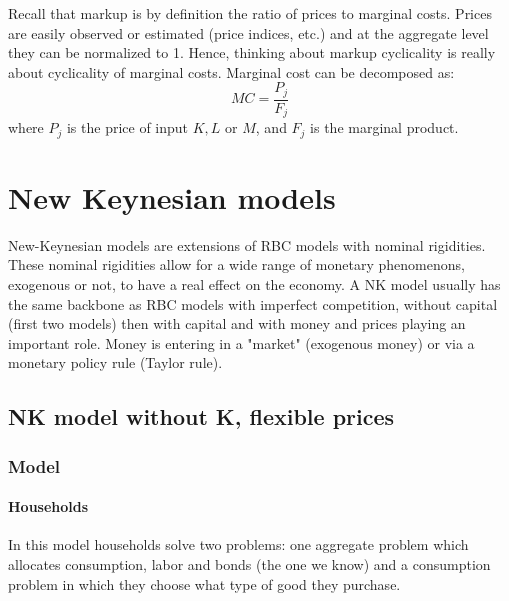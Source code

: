 \documentclass[12pt]{report}
\begin{document}
Recall that markup is by definition the ratio of prices to marginal costs. Prices are easily observed or estimated (price indices, etc.) and at the aggregate level they can be normalized to 1. Hence, thinking about markup cyclicality is really about cyclicality of marginal costs. Marginal cost can be decomposed as: $$MC = \frac{P_j}{F_j} $$ where $P_j$ is the price of input $K, L$ or $M$, and $F_j$ is the marginal product.

\chapter{New Keynesian models}

New-Keynesian models are extensions of RBC models with nominal rigidities. These nominal rigidities allow for a wide range of monetary phenomenons, exogenous or not, to have a real effect on the economy. A NK model usually has the same backbone as RBC models with imperfect competition, without capital (first two models) then with capital and with money and prices playing an important role. Money is entering in a "market" (exogenous money) or via a monetary policy rule (Taylor rule).

\section{NK model without K, flexible prices}

\subsection{Model}

\subsubsection{Households}

In this model households solve two problems: one aggregate problem which allocates consumption, labor and bonds (the one we know) and a consumption problem in which they choose what type of good they purchase.
\end{document}
